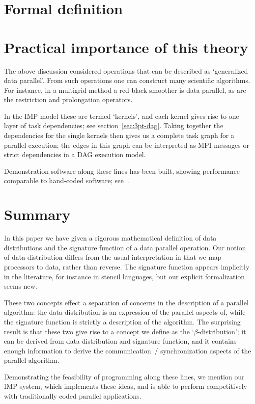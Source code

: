 \documentclass[11pt,fleqn]{article}
\begin{document}
\section{Formal definition}
\label{sec:formal}


\section{Practical importance of this theory}

The above discussion considered operations that can be described as
`generalized data parallel'. From such operations one can construct
many scientific algorithms. For instance, in a multigrid method a
red-black smoother is data parallel, as are the restriction and
prolongation operators.

In the \ac{IMP} model these are termed `kernels', and each kernel
gives rise to one layer of task dependencies; see
section~\ref{sec:3pt-dag}.
Taking together the dependencies for the single kernels
then gives us a complete task graph for a parallel execution;
the edges in this graph can be interpreted as MPI messages
or strict dependencies in a \ac{DAG} execution model.

Demonstration software along these lines has been built, showing
performance comparable to hand-coded software; see~\cite{IMP-19}.

\section{Summary}

In this paper we have given a rigorous mathematical definition of data
distributions and the signature function of a data parallel
operation. Our notion of data distribution differs from the usual
interpretation in that we map processors to data, rather than
reverse. The signature function appears implicitly in the literature, for
instance in stencil languages, but our explicit formalization seems
new.

These two concepts effect a separation of concerns in the description
of a parallel algorithm:
the data distribution is an expression of the parallel aspects of,
while the signature function is strictly a description of the
algorithm. The surprising result is that these two give rise to a
concept we define as the `$\beta$-distribution'; it can be derived
from data distribution and signature function, and it contains enough
information to derive the communication~/ synchronization aspects of
the parallel algorithm.

Demonstrating the feasibility of programming along these lines, we
mention our \acf{IMP} system, which implements these ideas, and is
able to perform competitively with traditionally coded parallel applications.





\end{document}
